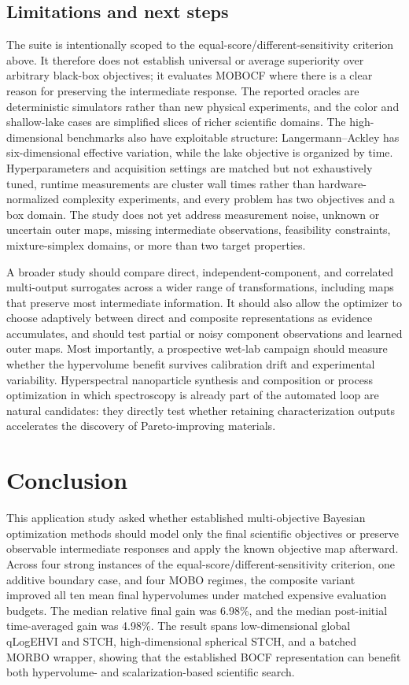 \documentclass{article}
\begin{document}
\subsection{Limitations and next steps}
The suite is intentionally scoped to the equal-score/different-sensitivity
criterion above.  It therefore does not establish universal or average
superiority over arbitrary black-box objectives; it evaluates MOBOCF where
there is a clear reason for preserving the intermediate response.  The
reported oracles are deterministic simulators rather than new physical
experiments, and the color and shallow-lake cases are simplified slices of
richer scientific domains.  The high-dimensional benchmarks also have
exploitable structure: Langermann--Ackley has six-dimensional effective
variation, while the lake objective is organized by time.  Hyperparameters and
acquisition settings are matched but not exhaustively tuned, runtime
measurements are cluster wall times rather than hardware-normalized complexity
experiments, and every problem has two objectives and a box domain.  The study
does not yet address measurement noise, unknown or uncertain outer maps,
missing intermediate observations, feasibility constraints, mixture-simplex
domains, or more than two target properties.

A broader study should compare direct, independent-component, and correlated
multi-output surrogates across a wider range of transformations, including
maps that preserve most intermediate information.  It should also allow the optimizer to choose
adaptively between direct and composite representations as evidence
accumulates, and should test partial or noisy component observations and
learned outer maps.  Most importantly, a prospective wet-lab campaign should
measure whether the hypervolume benefit survives calibration drift and
experimental variability.  Hyperspectral nanoparticle synthesis
\cite{low2024constrained} and composition or process optimization in which
spectroscopy is already part of the automated loop are natural candidates:
they directly test whether retaining characterization outputs accelerates the
discovery of Pareto-improving materials.

\section{Conclusion}
\label{sec:conclusion}

This application study asked whether established multi-objective Bayesian
optimization methods should model only the final scientific objectives or
preserve observable intermediate responses and apply the known objective map
afterward.  Across four strong instances of the
equal-score/different-sensitivity criterion, one additive boundary case, and
four MOBO regimes, the composite
variant improved all ten mean final hypervolumes under matched expensive
evaluation budgets.  The median relative final gain was 6.98\%, and the median
post-initial time-averaged gain was 4.98\%.  The result spans low-dimensional
global qLogEHVI and STCH, high-dimensional spherical STCH, and a batched MORBO
wrapper, showing that the established BOCF representation can benefit both
hypervolume- and scalarization-based scientific search.
\end{document}
